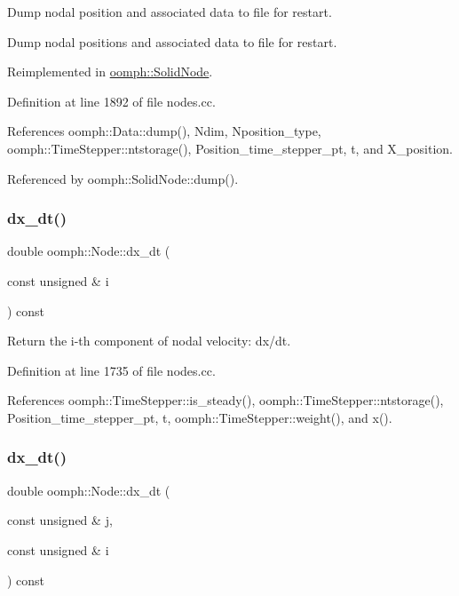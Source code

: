 Dump nodal position and associated data to file for restart. 

Dump nodal positions and associated data to file for restart. 

Reimplemented in \hyperlink{classoomph_1_1SolidNode_aad56eb7d55fcd10b3aaa34c5b4ab9f6a}{oomph\+::\+Solid\+Node}.



Definition at line 1892 of file nodes.\+cc.



References oomph\+::\+Data\+::dump(), Ndim, Nposition\+\_\+type, oomph\+::\+Time\+Stepper\+::ntstorage(), Position\+\_\+time\+\_\+stepper\+\_\+pt, t, and X\+\_\+position.



Referenced by oomph\+::\+Solid\+Node\+::dump().

\mbox{\label{classoomph_1_1Node_adecc64794ab05dfd0f1d53459fa42a93}} 
\subsubsection{\texorpdfstring{dx\+\_\+dt()}{dx\_dt()}\hspace{0.1cm}{\footnotesize\ttfamily [1/2]}}
{\footnotesize\ttfamily double oomph\+::\+Node\+::dx\+\_\+dt (\begin{DoxyParamCaption}\item[{const unsigned \&}]{i }\end{DoxyParamCaption}) const}



Return the i-\/th component of nodal velocity\+: dx/dt. 



Definition at line 1735 of file nodes.\+cc.



References oomph\+::\+Time\+Stepper\+::is\+\_\+steady(), oomph\+::\+Time\+Stepper\+::ntstorage(), Position\+\_\+time\+\_\+stepper\+\_\+pt, t, oomph\+::\+Time\+Stepper\+::weight(), and x().

\mbox{\label{classoomph_1_1Node_aa38adade14db8ea5b5f1015ebe657d31}} 
\subsubsection{\texorpdfstring{dx\+\_\+dt()}{dx\_dt()}\hspace{0.1cm}{\footnotesize\ttfamily [2/2]}}
{\footnotesize\ttfamily double oomph\+::\+Node\+::dx\+\_\+dt (\begin{DoxyParamCaption}\item[{const unsigned \&}]{j,  }\item[{const unsigned \&}]{i }\end{DoxyParamCaption}) const}



